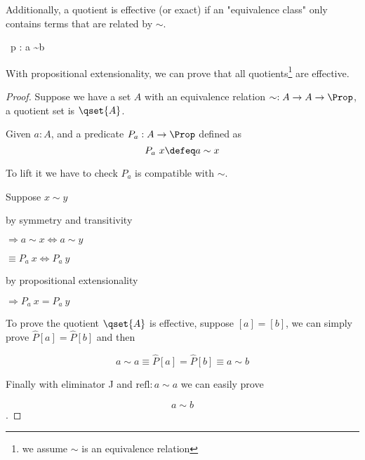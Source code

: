 Additionally, a quotient is effective (or exact) if an "equivalence class" only contains terms that are related by $\sim$.

{~{p} : a \sim b}

\begin{proposition}
With propositional extensionality, we can prove that all quotients\footnote{we assume $\sim$ is an equivalence relation} are effective.
\end{proposition}

\begin{proof}\label{PUEF}
Suppose we have a set $A$ with an equivalence relation $\sim : A \to A
\to \Prop$, a quotient set is $\qset{A}$.

Given $a : A$, and a predicate $P_a : A \to \Prop$ defined as 
$$P_a ~ x \defeq a \sim x$$

To lift it we have to check $P_a$ is compatible with $\sim$.

Suppose $x \sim y$

by symmetry and transitivity

$\Rightarrow a \sim x \iff a \sim y$

$\equiv P_a~x \iff P_a~y$

by propositional extensionality

$\Rightarrow P_a~x = P_a~y$


To prove the quotient $\qset{A}$ is effective, suppose $[ a ] = [ b ]$, we can simply prove $ \hat{P} [ a ] = \hat{P} [ b ]$ and then

$$a \sim a \equiv \hat{P} [ a ] = \hat{P} [ b ] \equiv a \sim b$$

Finally with eliminator J and $\text{refl} : a \sim a$ we can easily prove

$$a \sim b$$.

\end{proof}






